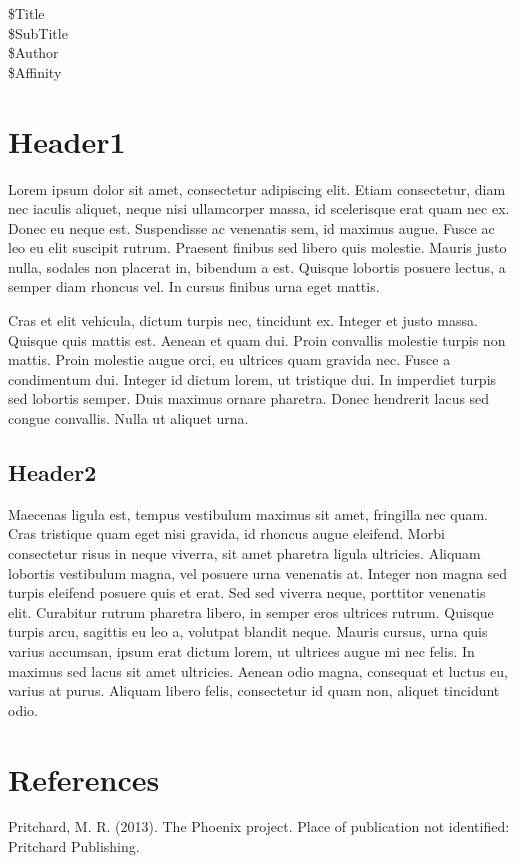 \documentclass[letter,man,natbib]{apa6}
\newcommand{\VarMainTitle}{\$Title\xspace}
\newcommand{\VarSubTitle}{\$SubTitle\xspace}
\newcommand{\VarAuthor}{\$Author\xspace}
\newcommand{\VarOrg}{\$Affinity\xspace}
\newcommand\titlehere{
	\begin{center}
		\hfill \break
		\hfill \break
		\hfill \break
		\hfill \break
		\hfill \break
		\hfill \break
		\hfill \break
		\hfill \break
		\hfill \break
		\VarMainTitle\\
		\VarSubTitle\\
		\hfill \break
		\VarAuthor\\
		\VarOrg\\
\clearpage
	\end{center}
}
\begin{document}
\titlehere

\section{Header1}
\hspace{10mm}Lorem ipsum dolor sit amet, consectetur adipiscing elit. Etiam consectetur, diam nec iaculis aliquet, neque nisi ullamcorper massa, id scelerisque erat quam nec ex. Donec eu neque est. Suspendisse ac venenatis sem, id maximus augue. Fusce ac leo eu elit suscipit rutrum. Praesent finibus sed libero quis molestie. Mauris justo nulla, sodales non placerat in, bibendum a est. Quisque lobortis posuere lectus, a semper diam rhoncus vel. In cursus finibus urna eget mattis.

\hspace{10mm}Cras et elit vehicula, dictum turpis nec, tincidunt ex. Integer et justo massa. Quisque quis mattis est. Aenean et quam dui. Proin convallis molestie turpis non mattis. Proin molestie augue orci, eu ultrices quam gravida nec. Fusce a condimentum dui. Integer id dictum lorem, ut tristique dui. In imperdiet turpis sed lobortis semper. Duis maximus ornare pharetra. Donec hendrerit lacus sed congue convallis. Nulla ut aliquet urna.

\subsection{Header2}
\hspace{10mm}Maecenas ligula est, tempus vestibulum maximus sit amet, fringilla nec quam. Cras tristique quam eget nisi gravida, id rhoncus augue eleifend. Morbi consectetur risus in neque viverra, sit amet pharetra ligula ultricies. Aliquam lobortis vestibulum magna, vel posuere urna venenatis at. Integer non magna sed turpis eleifend posuere quis et erat. Sed sed viverra neque, porttitor venenatis elit. Curabitur rutrum pharetra libero, in semper eros ultrices rutrum. Quisque turpis arcu, sagittis eu leo a, volutpat blandit neque. Mauris cursus, urna quis varius accumsan, ipsum erat dictum lorem, ut ultrices augue mi nec felis. In maximus sed lacus sit amet ultricies. Aenean odio magna, consequat et luctus eu, varius at purus. Aliquam libero felis, consectetur id quam non, aliquet tincidunt odio.



\clearpage
\section{References}
Pritchard, M. R. (2013). The Phoenix project. Place of publication not identified: \\
\hspace{10mm}Pritchard Publishing.
\end{document}
